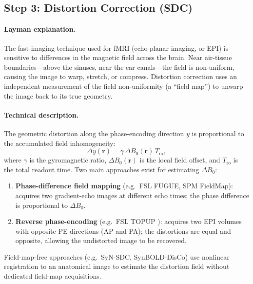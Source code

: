 \documentclass[11pt,a4paper]{article}
\begin{document}
\subsection{Step 3: Distortion Correction (SDC)}
\label{app:sdc}

\paragraph{Layman explanation.}
The fast imaging technique used for fMRI (echo-planar imaging, or EPI) is sensitive to differences in the magnetic field across the brain.  Near air-tissue boundaries---above the sinuses, near the ear canals---the field is non-uniform, causing the image to warp, stretch, or compress.  Distortion correction uses an independent measurement of the field non-uniformity (a ``field map'') to unwarp the image back to its true geometry.

\paragraph{Technical description.}
The geometric distortion along the phase-encoding direction $y$ is proportional to the accumulated field inhomogeneity:
\begin{equation}
    \Delta y(\mathbf{r}) = \gamma \, \Delta B_0(\mathbf{r}) \, T_{\mathrm{ro}},
\end{equation}
where $\gamma$ is the gyromagnetic ratio, $\Delta B_0(\mathbf{r})$ is the local field offset, and $T_{\mathrm{ro}}$ is the total readout time.  Two main approaches exist for estimating $\Delta B_0$:

\begin{enumerate}[label=(\alph*)]
    \item \textbf{Phase-difference field mapping} (e.g.\ FSL FUGUE, SPM FieldMap): acquires two gradient-echo images at different echo times; the phase difference is proportional to $\Delta B_0$.
    \item \textbf{Reverse phase-encoding} (e.g.\ FSL TOPUP \citep{andersson2003}): acquires two EPI volumes with opposite PE directions (AP and PA); the distortions are equal and opposite, allowing the undistorted image to be recovered.
\end{enumerate}

Field-map-free approaches (e.g.\ SyN-SDC, SynBOLD-DisCo) use nonlinear registration to an anatomical image to estimate the distortion field without dedicated field-map acquisitions.
\end{document}
